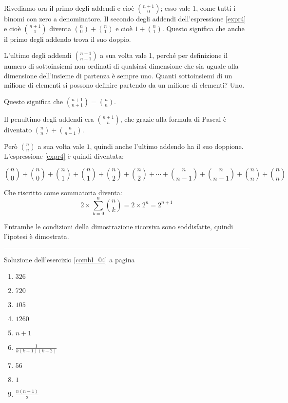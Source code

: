 Rivediamo ora il primo degli addendi e cioè ${n+1 \choose 0}$; esso vale $1$, come tutti i binomi con zero a denominatore.
Il secondo degli addendi dell'espressione \ref{expr4} e cioè ${n+1\choose 1}$ diventa ${n\choose 0}+{n\choose 1}$ e cioè $1+{n\choose 1}$.  Questo significa che anche il primo degli addendo trova il suo doppio.

L'ultimo degli addendi ${n+1\choose n+1}$ a sua volta vale 1, perché per definizione il numero di sottoinsiemi non ordinati di qualsiasi dimensione che sia uguale alla dimensione dell'insieme di partenza è sempre uno.  Quanti sottoinsiemi di un milione di elementi si possono definire partendo da un milione di elementi?  Uno.

Questo significa che ${n+1\choose n+1}={n\choose n}$.

Il penultimo degli addendi era ${n+1\choose n}$, che grazie alla formula di Pascal è diventato ${n\choose n}+{n\choose n-1}$.

Però ${n\choose n}$ a sua volta vale $1$, quindi anche l'ultimo addendo ha il suo doppione.  L'espressione \ref{expr4} è quindi diventata:

\[
{n\choose 0}+{n\choose 0}+
{n\choose 1}+{n\choose 1}+
{n\choose 2}+{n\choose 2}+\cdots+
{n\choose n-1}+{n\choose n-1}+
{n\choose n}+{n\choose n}
\]

Che riscritto come sommatoria diventa:
\[
2\times\sum_{k=0}^n{{n\choose k}} = 2\times2^n=2^{n+1}
\]

Entrambe le condizioni della dimostrazione ricorsiva sono soddisfatte, quindi l'ipotesi è dimostrata.

\vspace{1cm}
\hrule
\vspace{1cm}

Soluzione dell'esercizio \ref{combl_04} a pagina \pageref{combl_04}\label{combs_04}

\begin{enumerate}[label=(\alph*)]
\item $326$
\item $720$
\item $105$
\item $1260$
\item $n+1$
\item $\frac{1}{k(k+1)(k+2)}$
\item $56$
\item $1$
\item $\frac{n(n-1)}{2}$
\end{enumerate}

